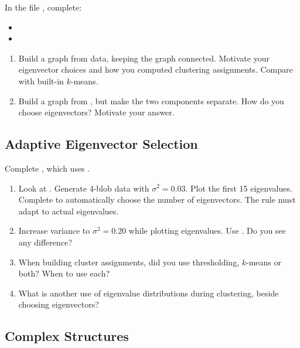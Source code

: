 \documentclass[11pt]{article}
\begin{document}
In the file , complete:
\begin{itemize}[leftmargin=*]
	\item {}
	\item {}
\end{itemize}

\begin{questionbox}
\begin{enumerate}[leftmargin=*]
    \item Build a graph from  data, keeping
        the graph connected. Motivate your eigenvector choices
        and how you computed clustering assignments.
        Compare with built-in $k$-means.
    \item Build a graph from , but
        make the two components separate.
        How do you choose eigenvectors? Motivate your answer.
\end{enumerate}
\end{questionbox}

\subsection{Adaptive Eigenvector Selection}

Complete , which uses .

\begin{questionbox}
\begin{enumerate}[leftmargin=*,resume]
    \item Look at . Generate 4-blob data with
        $\sigma^2=0.03$. Plot the first 15 eigenvalues.
        Complete  to automatically choose
        the number of eigenvectors. The rule must adapt to actual eigenvalues.
    \item Increase variance to $\sigma^2=0.20$ while plotting
        eigenvalues. Use .
        Do you see any difference?
    \item When building cluster assignments, did you use thresholding,
        $k$-means or both? When to use each?
    \item What is another use of eigenvalue distributions during clustering,
        beside choosing eigenvectors?
\end{enumerate}
\end{questionbox}

\subsection{Complex Structures}
\end{document}
